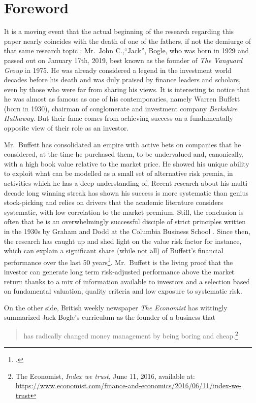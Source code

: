 \section*{Foreword}
\label{Foreword}
It is a moving event that the actual beginning of the research regarding this paper nearly coincides with the death of one of the fathers, if not the demiurge of that same research topic : Mr.~John C.,``Jack'', Bogle, who was born in 1929 and passed out on January 17th, 2019, best known as the founder of \textit{The Vanguard Group} in 1975. He was already considered a legend in the investment world decades before his death and was duly praised by finance leaders and scholars, even by those who were far from sharing his views. It is interesting to notice that he was almost as famous as one of his contemporaries, namely Warren Buffett (born in 1930), chairman of conglomerate and investment company \textit{Berkshire Hathaway}. But their fame comes from achieving success on a fundamentally opposite view of their role as an investor.

Mr.~Buffett has consolidated an empire with active bets on companies that he considered, at the time he purchased them, to be undervalued and, canonically, with a high book value relative to the market price. He showed his unique ability to exploit what can be modelled as a small set of alternative risk premia, in activities which he has a deep understanding of. Recent research about his multi-decade long winning streak has shown his success is more systematic than genius stock-picking and relies on drivers that the academic literature considers systematic, with low correlation to the market premium. Still, the conclusion is often that he is an overwhelmingly successful disciple of strict principles written in the 1930s by Graham and Dodd at the Columbia Business School \parencite{Graham1962}. Since then, the research has caught up and shed light on the value risk factor for instance, which can explain a significant share (while not all) of Buffett's financial performance over the last 50 years\footcite{Frazzini2018}. Mr.~Buffett is the living proof that the investor can generate long term risk-adjusted performance above the market return thanks to a mix of information available to investors and a selection based on fundamental valuation, quality criteria and low exposure to systematic risk.

On the other side, British weekly newspaper \textit{The Economist} has wittingly summarized Jack Bogle's curriculum as the founder of a business that
\begin{quotation}
has radically changed money management by being boring and cheap.\footnote{The Economist, \emph{Index we trust}, June 11, 2016, available at: \url{https://www.economist.com/finance-and-economics/2016/06/11/index-we-trust}}
\end{quotation}

